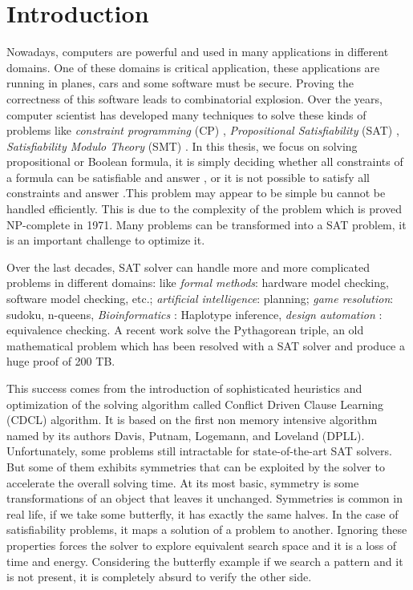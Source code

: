 \chapter{Introduction}\label{chap:intro}

Nowadays, computers are powerful and used in many applications in different domains.
One of these domains is critical application, these applications are running in planes, cars
and some software must be secure. Proving the correctness of this software leads
to combinatorial explosion.
Over the years, computer scientist has developed many techniques to solve 
these kinds of problems like \emph{constraint programming} (CP) \cite{rossi2006handbook},
\emph{Propositional Satisfiability} (SAT) \cite{biere2009handbook},
\emph{Satisfiability Modulo Theory} (SMT) \cite{barrett2018satisfiability}.
In this thesis, we focus on solving propositional or Boolean formula, it is simply deciding whether 
all constraints of a formula can be satisfiable and answer \sat, or it is not possible to satisfy all
constraints and answer \unsat.This problem may appear to be simple bu cannot be handled efficiently.
This is due to the complexity of the problem which is proved NP-complete in 1971. Many problems can
be transformed into a SAT problem, it is an important challenge to optimize it.

Over the last decades, SAT solver can handle more and more complicated problems in different domains:
like \emph{formal methods}: hardware model checking,
software model checking, etc.; \emph{artificial intelligence}: planning; \emph{game resolution}:
sudoku, n-queens, \emph{Bioinformatics} : Haplotype inference,
\emph{design automation} : equivalence checking.
A recent work solve the Pythagorean triple, an old mathematical problem which has been resolved with 
a SAT solver and produce a huge proof of 200 TB.
 
This success comes from the introduction of sophisticated heuristics and optimization of the solving 
algorithm called Conflict Driven Clause Learning (CDCL) algorithm. It is based on the first non memory
intensive algorithm named by its authors Davis, Putnam, Logemann, and Loveland (DPLL).
Unfortunately, some problems still intractable for state-of-the-art SAT solvers. But some 
of them exhibits symmetries that can be exploited by the solver to accelerate the overall solving time.
At its most basic, symmetry is some transformations of an object that leaves it unchanged.
Symmetries is common in real life, if we take some butterfly, it has exactly the same halves.
In the case of satisfiability problems, it maps a solution of a problem to another.
Ignoring these properties forces the solver to explore equivalent search space and it is a loss of
time and energy. Considering the butterfly example if we search a pattern and it is not present, it is
completely absurd to verify the other side. 

